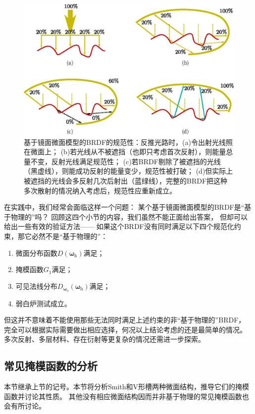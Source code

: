 \begin{figure}[htbp]
    \centering
    \includegraphics[width=\linewidth]{Pictures/chap08/CompleteWhiteFurnaceTest.eps}
    \caption{基于镜面微面模型的BRDF的规范性：反推光路时，(a)令出射光线照在微面上；
    (b)若光线从不被遮挡（也即只考虑首次反射），则能量总量不变，反射光线满足规范性；
    (c)若BRDF剔除了被遮挡的光线（黑虚线），则能成功反射的能量变少，规范性被打破；
    (d)但实际上被遮挡的光线会多反射几次后射出（蓝绿线），完整的BRDF把这种多次散射的情况纳入考虑后，规范性应重新成立。}
    \label{fig:08ex01-CompleteWhiteFurnaceTest}
\end{figure}

在实践中，我们经常会面临这样一个问题：
某个基于镜面微面模型的BRDF是“基于物理的”吗？
回顾这四个小节的内容，我们虽然不能正面给出答案，
但却可以给出一些有效的验证方法——
如果这个BRDF没有同时满足以下四个规范化约束，那它必然不是“基于物理的”：
\begin{enumerate}
    \item 微面分布函数$D({\bm\omega}_{\mathrm{h}})$满足；
    \item 掩模函数$G_1$满足；
    \item 可见法线分布$D_{{\bm\omega}_{\mathrm{o}}}({\bm\omega}_{\mathrm{h}})$满足；
    \item 弱白炉测试成立。
\end{enumerate}
但这并不意味着不能使用那些无法同时满足上述约束的非“基于物理的”BRDF，
完全可以根据实际需要做出相应选择，何况以上结论考虑的还是最简单的情况。
多次反射、多层材料、存在衍射等更复杂的情况还需进一步探索。

\subsection{常见掩模函数的分析}\label{sub:常见掩模函数的分析}
本节继承上节的记号。本节将分析Smith和V形槽两种微面结构，推导它们的掩模函数并讨论其性质。
其他没有相应微面结构因而并非基于物理的常见掩模函数也会有所讨论。


